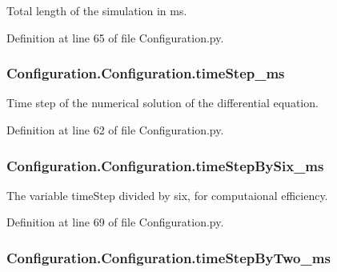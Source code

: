 Total length of the simulation in ms. 



Definition at line 65 of file Configuration.\-py.

\hypertarget{class_configuration_1_1_configuration_a6379aaa6e54523ca81e3713d1846679b}{
\subsubsection[{time\-Step\-\_\-ms}]{\setlength{\rightskip}{0pt plus 5cm}Configuration.\-Configuration.\-time\-Step\-\_\-ms}}\label{class_configuration_1_1_configuration_a6379aaa6e54523ca81e3713d1846679b}


Time step of the numerical solution of the differential equation. 



Definition at line 62 of file Configuration.\-py.

\hypertarget{class_configuration_1_1_configuration_aa49387a016f5d528136ab5812821cb99}{
\subsubsection[{time\-Step\-By\-Six\-\_\-ms}]{\setlength{\rightskip}{0pt plus 5cm}Configuration.\-Configuration.\-time\-Step\-By\-Six\-\_\-ms}}\label{class_configuration_1_1_configuration_aa49387a016f5d528136ab5812821cb99}


The variable time\-Step divided by six, for computaional efficiency. 



Definition at line 69 of file Configuration.\-py.

\hypertarget{class_configuration_1_1_configuration_a58f6e3bf5491f8fb229697fc3690aa12}{
\subsubsection[{time\-Step\-By\-Two\-\_\-ms}]{\setlength{\rightskip}{0pt plus 5cm}Configuration.\-Configuration.\-time\-Step\-By\-Two\-\_\-ms}}\label{class_configuration_1_1_configuration_a58f6e3bf5491f8fb229697fc3690aa12}


